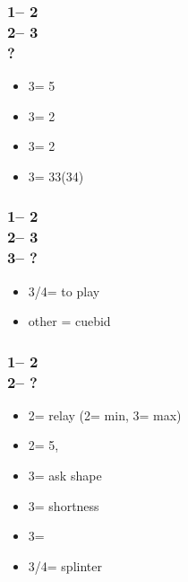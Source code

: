 \documentclass[12pt, a4paper]{report}
\begin{document}
{{        \subsubsection*{1\nt -- 2\clubs\\
                        2\diams -- 3\clubs\\
                        ?}
        \begin{itemize}
            \item 3\diams = 5\minor \qq
            \item 3\hearts = 2\spades
            \item 3\spades = 2\hearts
            \item 3\nt = 33(34)
        \end{itemize}

        \subsubsection*{1\nt -- 2\clubs\\
                        2\diams -- 3\diams\\
                        3\major -- ?}
        \begin{itemize}
            \item 3\nt/4\major = to play
            \item other = cuebid
        \end{itemize}

        \subsubsection*{1\nt -- 2\clubs\\
                        2\hearts -- ?}
        \begin{itemize}
            \item 2\spades = relay (2\nt = min, 3\clubs = max)
            \item 2\nt = 5\spades, \inv
            \item 3\clubs = ask shape
            \item 3\diams = \minor shortness
            \item 3\hearts = \inv
            \item 3\spades/4\minor = splinter
        \end{itemize}

}}
\end{document}
